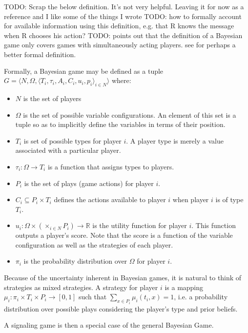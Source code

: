\documentclass{article}
\begin{document}
TODO: Scrap the below definition. It's not very helpful. Leaving it for now as a reference and I like some of the things I wrote
TODO: how to formally account for available information using this definition, e.g. that R knows the message when R chooses his action?
TODO: \cite{nurmi1} points out that the definition of a Bayesian game only covers games with simultaneously acting players. see \cite{fudenberg1} for perhaps a better formal definition.

Formally, a Bayesian game may be defined as a tuple $ G = \langle N, \Omega, \langle T_{i}, \tau_{i}, A_{i}, C_{i}, u_{i}, p_{i} \rangle _{i \in N} \rangle $ where:

\begin{itemize}
\item $N$ is the set of players
\item $\Omega$ is the set of possible variable configurations. An element of this set is a tuple so as to implicitly define the variables in terms of their position.
\item $T_{i}$ is set of possible types for player $i$. A player type is merely a value associated with a particular player.
\item $\tau_{i}:\Omega \to T_{i}$ is a function that assigns types to players.
\item $P_{i}$ is the set of plays (game actions) for player $i$.
\item $C_{i} \subseteq P_{i} \times T_{i}$ defines the actions available to player $i$ when player $i$ is of type $T_{i}$. 
\item $u_i:\Omega \times (\times_{i \in N} P_{i}) \to \mathbb{R}$ is the utility function for player $i$. This function outputs a player's score. Note that the score is a function of the variable configuration as well as the strategies of each player.
\item $\pi_{i}$ is the probability distribution over $\Omega$ for player $i$.
\end{itemize}

\noindent Because of the uncertainty inherent in Bayesian games, it is natural to think of strategies as mixed strategies. A strategy for player $i$ is a mapping $\mu_i: \pi_i \times T_i \times P_i \to [0,1]$ such that $\sum_{x \in P_i} \mu_i(t_i, x) = 1$, i.e. a probability distribution over possible plays considering the player's type and prior beliefs.

\noindent A signaling game is then a special case of the general Bayesian Game.
\end{document}
